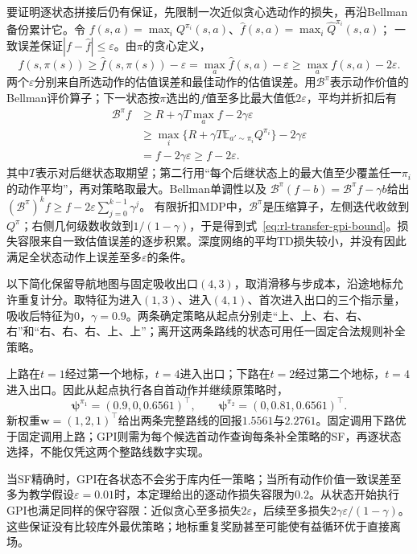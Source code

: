 要证明逐状态拼接后仍有保证，先限制一次近似贪心选动作的损失，再沿Bellman备份累计它。令
$f(s,a)=\max_iQ^{\pi_i}(s,a)$、$\widehat f(s,a)=\max_i\widehat Q^{\pi_i}(s,a)$；
一致误差保证$|f-\widehat f|\leq\varepsilon$。由$\pi$的贪心定义，
\[
 f(s,\pi(s))\geq\widehat f(s,\pi(s))-\varepsilon
 =\max_a\widehat f(s,a)-\varepsilon
 \geq\max_a f(s,a)-2\varepsilon.
\]
两个$\varepsilon$分别来自所选动作的估值误差和最佳动作的估值误差。用$\mathcal B^\pi$表示动作价值的Bellman评价算子；下一状态按$\pi$选出的$f$值至多比最大值低$2\varepsilon$，平均并折扣后有
\begin{align*}
 \mathcal B^\pi f
 &\geq R+\gamma T\max_a f-2\gamma\varepsilon\\
 &\geq \max_i\{R+\gamma T\mathbb E_{a'\sim\pi_i}Q^{\pi_i}\}
           -2\gamma\varepsilon\\
 &=f-2\gamma\varepsilon\geq f-2\varepsilon.
\end{align*}
其中$T$表示对后继状态取期望；第二行用“每个后继状态上的最大值至少覆盖任一$\pi_i$的动作平均”，再对策略取最大。Bellman单调性以及
$\mathcal B^\pi(f-b)=\mathcal B^\pi f-\gamma b$给出
$(\mathcal B^\pi)^k f\geq f-2\varepsilon\sum_{j=0}^{k-1}\gamma^j$。
有限折扣MDP中，$\mathcal B^\pi$是压缩算子，左侧迭代收敛到$Q^\pi$；右侧几何级数收敛到$1/(1-\gamma)$，于是得到式~\eqref{eq:rl-transfer-gpi-bound}。损失容限来自一致估值误差的逐步积累。深度网络的平均TD损失较小，并没有因此满足全状态动作上误差至多$\varepsilon$的条件。

\begin{example}[两条绕障策略的新奖励评价]
 \label{ex:rl-transfer-sf-routes}
 以下简化保留导航地图与固定吸收出口$(4,3)$，取消滑移与步成本，沿途地标允许重复计分。取特征为进入$(1,3)$、进入$(4,1)$、首次进入出口的三个指示量，吸收后特征为0，$\gamma=0.9$。两条确定策略从起点分别走“上、上、右、右、右”和“右、右、右、上、上”；离开这两条路线的状态可用任一固定合法规则补全策略。

 上路在$t=1$经过第一个地标，$t=4$进入出口；下路在$t=2$经过第二个地标，$t=4$进入出口。因此从起点执行各自首动作并继续原策略时，
 \[
 \bm\psi^{\pi_1}=(0.9,0,0.6561)^\top,\qquad
 \bm\psi^{\pi_2}=(0,0.81,0.6561)^\top.
 \]
 新权重$\bm w=(1,2,1)^\top$给出两条完整路线的回报$1.5561$与$2.2761$。固定调用下路优于固定调用上路；GPI则需为每个候选首动作查询每条补全策略的SF，再逐状态选择，不能仅凭这两个整路线数字实现。

 当SF精确时，GPI在各状态不会劣于库内任一策略；当所有动作价值一致误差至多为教学假设$\varepsilon=0.01$时，本定理给出的逐动作损失容限为$0.2$。从状态开始执行GPI也满足同样的保守容限：近似贪心至多损失$2\varepsilon$，后续至多损失$2\gamma\varepsilon/(1-\gamma)$。这些保证没有比较库外最优策略；地标重复奖励甚至可能使有益循环优于直接离场。
\end{example}

